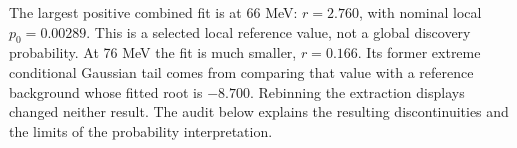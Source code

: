 The largest positive combined fit is at 66 MeV: $r=2.760$, with nominal local $p_0=0.00289$. This is a selected local reference value, not a global discovery probability. At 76 MeV the fit is much smaller, $r=0.166$. Its former extreme conditional Gaussian tail comes from comparing that value with a reference background whose fitted root is $-8.700$. Rebinning the extraction displays changed neither result. The audit below explains the resulting discontinuities and the limits of the probability interpretation.
